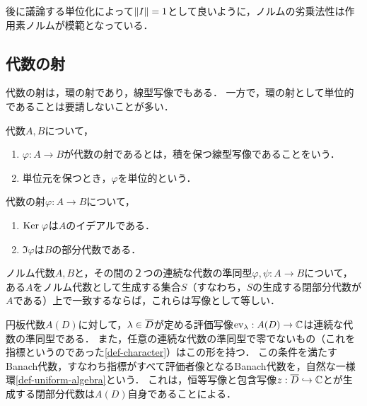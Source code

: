 \documentclass[uplatex,dvipdfmx]{jsreport}
\begin{document}
\begin{remarks}[作用素ノルムの立ち位置]
    後に議論する単位化によって$\|I\|=1$として良いように，ノルムの劣乗法性は作用素ノルムが模範となっている．
\end{remarks}

\subsection{代数の射}

\begin{tcolorbox}[colframe=ForestGreen, colback=ForestGreen!10!white,breakable,colbacktitle=ForestGreen!40!white,coltitle=black,fonttitle=\bfseries\sffamily,
title=]
    代数の射は，環の射であり，線型写像でもある．
    一方で，環の射として単位的であることは要請しないことが多い．
\end{tcolorbox}

\begin{definition}
    代数$A,B$について，
    \begin{enumerate}
        \item $\varphi:A\to B$が代数の射であるとは，積を保つ線型写像であることをいう．
        \item 単位元を保つとき，$\varphi$を単位的という．
    \end{enumerate}
\end{definition}

\begin{lemma}
    代数の射$\varphi:A\to B$について，
    \begin{enumerate}
        \item $\mathrm{Ker}\;\varphi$は$A$のイデアルである．
        \item $\Im\varphi$は$B$の部分代数である．
    \end{enumerate}
\end{lemma}

\begin{lemma}
    ノルム代数$A,B$と，その間の２つの連続な代数の準同型$\varphi,\psi:A\to B$について，ある$A$をノルム代数として生成する集合$S$（すなわち，$S$の生成する閉部分代数が$A$である）上で一致するならば，これらは写像として等しい．
\end{lemma}

\begin{example}
    円板代数$A(D)$に対して，$\lambda\in\overline{D}$が定める評価写像$\mathrm{ev}_\lambda:A(D)\to\mathbb{C}$は連続な代数の準同型である．
    また，任意の連続な代数の準同型で零でないもの（これを指標というのであった\ref{def-character}）はこの形を持つ．
    この条件を満たすBanach代数，すなわち指標がすべて評価者像となるBanach代数を，自然な一様環\ref{def-uniform-algebra}という．
    これは，恒等写像と包含写像$z:\overline{D}\hookrightarrow\mathbb{C}$とが生成する閉部分代数は$A(D)$自身であることによる．
\end{example}
\end{document}
